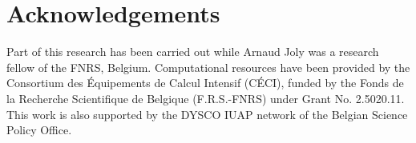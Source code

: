 \documentclass{article}
\begin{document}
\section*{Acknowledgements} 
Part of this research has been carried out while Arnaud Joly was a research 
fellow of the FNRS, Belgium. Computational resources have been provided by the 
Consortium des \'Equipements de Calcul Intensif (C\'ECI), funded by the Fonds 
de la Recherche Scientifique de Belgique (F.R.S.-FNRS) under Grant No. 
2.5020.11. This work is also supported by the DYSCO IUAP network of the Belgian 
Science Policy Office.




\end{document}
